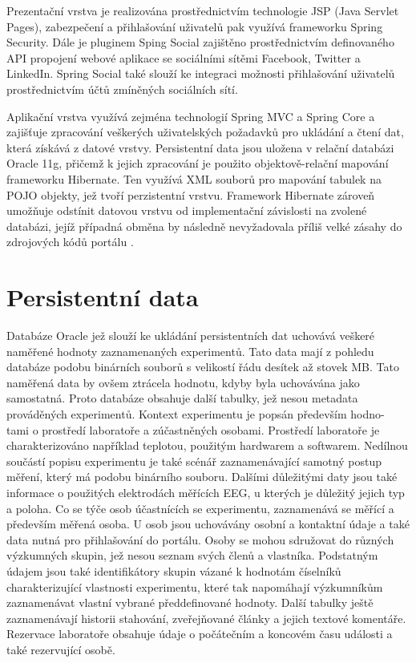 \documentclass{projekt}
\begin{document}
Prezentační vrstva je realizována prostřednictvím technologie JSP (Java Servlet Pages), zabezpečení a přihlašování uživatelů pak využívá frameworku Spring Security. Dále je pluginem Sping Social zajištěno prostřednictvím definovaného API propojení webové aplikace se sociálními sítěmi Facebook, Twitter a LinkedIn. Spring Social také slouží ke integraci možnosti přihlašování uživatelů prostřednictvím účtů zmíněných sociálních sítí.

Aplikační vrstva využívá zejména technologií Spring MVC a Spring Core a zajišťuje zpracování veškerých uživatelských požadavků pro ukládání a čtení dat, která získává z datové vrstvy. Persistentní data jsou uložena v relační databázi Oracle 11g, přičemž k jejich zpracování je použito objektově-relační mapování frameworku Hibernate. Ten využívá XML souborů pro mapování tabulek na POJO objekty, jež tvoří perzistentní vrstvu. Framework Hibernate zároveň umožňuje odstínit datovou vrstvu od implementační závislosti na zvolené databázi, jejíž případná obměna by následně nevyžadovala příliš velké zásahy do zdrojových kódů portálu \cite{_16}.


\section{Persistentní data}
\hspace{0.65cm}Databáze Oracle jež slouží ke ukládání persistentních dat uchovává veškeré naměřené hodnoty zaznamenaných experimentů. Tato data mají z pohledu databáze podobu binárních souborů s velikostí řádu desítek až stovek MB. Tato naměřená data by ovšem ztrácela hodnotu, kdyby byla uchovávána jako samostatná. Proto databáze obsahuje další tabulky, jež nesou metadata prováděných experimentů. Kontext experimentu je popsán především hodno-\\tami o prostředí laboratoře a zúčastněných osobami. Prostředí laboratoře je charakterizováno například teplotou, použitým hardwarem a softwarem. Nedílnou součástí popisu experimentu je také scénář zaznamenávající samotný postup měření, který má podobu binárního souboru. Dalšími důležitými daty jsou také informace o použitých elektrodách měřících EEG, u kterých je důležitý jejich typ a poloha. Co se týče osob účastnících se experimentu, zaznamenává se měřící a především měřená osoba. U osob jsou uchovávány osobní a kontaktní údaje a také data nutná pro přihlašování do portálu. Osoby se mohou sdružovat do různých výzkumných skupin, jež nesou seznam svých členů a vlastníka. Podstatným údajem jsou také identifikátory skupin vázané k hodnotám číselníků charakterizující vlastnosti experimentu, které tak napomáhají výzkumníkům zaznamenávat vlastní vybrané předdefinované hodnoty. Další tabulky ještě zaznamenávají historii stahování, zveřejňované články a jejich textové komentáře. Rezervace laboratoře obsahuje údaje o počátečním a koncovém času události a také rezervující osobě. 
\end{document}
